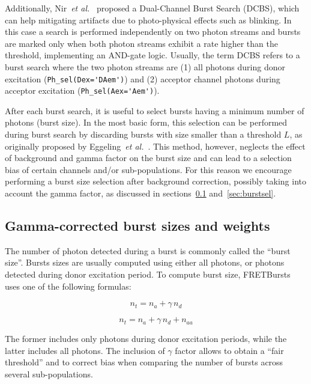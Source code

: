 Additionally, Nir~\textit{et al.}~\cite{Nir_2006} proposed a Dual-Channel Burst
Search (DCBS), which can help mitigating artifacts due to
photo-physical effects such as blinking. In this case a search is performed
independently on two photon streams and bursts are marked only when both photon
streams exhibit a rate higher than the threshold,
implementing an AND-gate logic.
Usually, the term DCBS refers to a burst search where the two photon streams
are (1) all photons
during donor excitation (\verb|Ph_sel(Dex='DAem')|) and (2) acceptor channel photons
during acceptor
excitation (\verb|Ph_sel(Aex='Aem')|).

After each burst search, it is useful to select
bursts having a minimum number of photons (burst size). In the most
basic form, this selection can be performed during burst search by discarding
bursts with size smaller than a threshold $L$, as originally proposed by
Eggeling~\textit{et al.}~\cite{Eggeling_1998}.
This method, however, neglects the effect
of background and gamma factor on the burst size and can lead to a selection
bias of certain channels and/or sub-populations.
For this reason we encourage performing a burst size selection after background
correction, possibly taking into account the gamma factor, as discussed in
sections~\ref{sec:burstsizeweights} and~\ref{sec:burstsel}.

\subsection{Gamma-corrected burst sizes and weights}
\label{sec:burstsizeweights}

The number of photon detected during a burst is commonly called the ``burst size''.
Bursts sizes are usually computed using either all photons, or photons detected 
during donor excitation period. To compute burst size, FRETBursts uses 
one of the following formulas:

\begin{equation}
\label{eq:burstsize_dex}
n_t = n_a + \gamma\,n_d 
\end{equation}

\begin{equation}
\label{eq:burstsize_allph}
n_t = n_a + \gamma\,n_d + n_{aa}
\end{equation}

The former includes  only photons during donor excitation periods, 
while the latter includes all photons.
The inclusion of $\gamma$ factor allows to obtain a ``fair threshold''
and to correct bias when comparing the number of bursts across several sub-populations.

